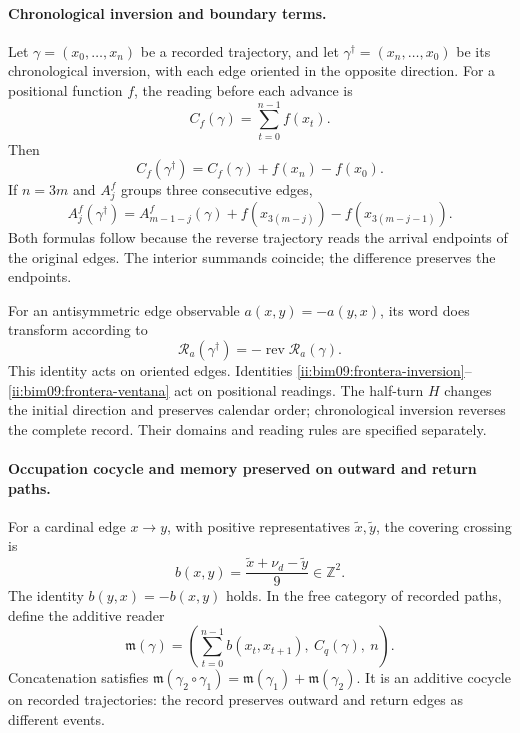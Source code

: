 \paragraph{Chronological inversion and boundary terms.}

Let $\gamma=(x_0,\ldots,x_n)$ be a recorded trajectory, and let
$\gamma^\dagger=(x_n,\ldots,x_0)$ be its chronological inversion, with each
edge oriented in the opposite direction. For a positional function $f$,
the reading before each advance is
\[
 C_f(\gamma)=\sum_{t=0}^{n-1}f(x_t).
\]
Then
\begin{equation}
 C_f(\gamma^\dagger)=C_f(\gamma)+f(x_n)-f(x_0).
 \label{ii:bim09:frontera-inversion}
\end{equation}
If $n=3m$ and $A_j^f$ groups three consecutive edges,
\begin{equation}
 A_j^f(\gamma^\dagger)=A_{m-1-j}^f(\gamma)
 +f(x_{3(m-j)})-f(x_{3(m-j-1)}).
 \label{ii:bim09:frontera-ventana}
\end{equation}
Both formulas follow because the reverse trajectory reads the arrival
endpoints of the original edges. The interior summands coincide;
the difference preserves the endpoints.

For an antisymmetric edge observable $a(x,y)=-a(y,x)$, its word
does transform according to
\[
 \mathcal R_a(\gamma^\dagger)
 =-\operatorname{rev}\mathcal R_a(\gamma).
\]
This identity acts on oriented edges. Identities
\eqref{ii:bim09:frontera-inversion}--\eqref{ii:bim09:frontera-ventana}
act on positional readings. The half-turn $H$ changes the
initial direction and preserves calendar order; chronological
inversion reverses the complete record. Their domains and reading rules
are specified separately.

\paragraph{Occupation cocycle and memory preserved on outward and return paths.}

For a cardinal edge $x\to y$, with positive representatives
$\widetilde x,\widetilde y$, the covering crossing is
\[
 b(x,y)=\frac{\widetilde x+\nu_d-\widetilde y}{9}\in\mathbb Z^2.
\]
The identity $b(y,x)=-b(x,y)$ holds. In the free category of recorded
paths, define the additive reader
\begin{equation}
 \mathfrak m(\gamma)=
 \left(\sum_{t=0}^{n-1}b(x_t,x_{t+1}),\ C_q(\gamma),\ n\right).
 \label{ii:bim09:memoria-aditiva}
\end{equation}
Concatenation satisfies
$\mathfrak m(\gamma_2\circ\gamma_1)=
\mathfrak m(\gamma_1)+\mathfrak m(\gamma_2)$.
It is an additive cocycle on recorded trajectories: the record preserves
outward and return edges as different events.

